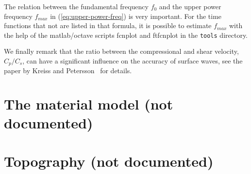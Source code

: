 \documentclass[11pt]{report}
\begin{document}
The relation between the fundamental frequency $f_0$ and the upper power
frequency $f_{max}$ in (\ref{eq:upper-power-freq}) is very important. For the time functions that
not are listed in that formula, it is possible to estimate
$f_{max}$ with the help of the matlab/octave scripts fcnplot and ftfcnplot in the {\tt tools}
directory. 

We finally remark that the ratio between the compressional and shear velocity, $C_p/C_s$, can have a
significant influence on the accuracy of surface waves, see the paper by Kreiss and
Petersson~\cite{KrePet-12} for details.


\chapter{The material model (not documented)} \label{sec:material}

\chapter{Topography (not documented)} \label{sec:topography}


\end{document}
